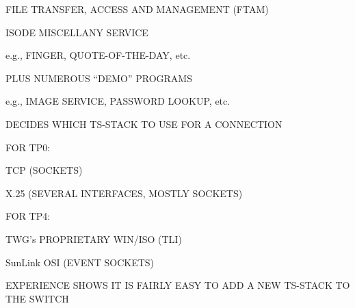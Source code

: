 

\begin{bwslide}

\begin{nrtc}
\item	FILE TRANSFER, ACCESS AND MANAGEMENT (FTAM)

\item	ISODE MISCELLANY SERVICE
    \begin{nrtc}
    \item	e.g., FINGER, QUOTE-OF-THE-DAY, etc.
    \end{nrtc}

\item	PLUS NUMEROUS ``DEMO'' PROGRAMS
    \begin{nrtc}
    \item	e.g., IMAGE SERVICE, PASSWORD LOOKUP, etc.
    \end{nrtc}
\end{nrtc}
\end{bwslide}


\begin{bwslide}

\begin{nrtc}
\item	DECIDES WHICH TS-STACK TO USE FOR A CONNECTION

\item	FOR TP0:
    \begin{nrtc}
    \item	TCP (SOCKETS)

    \item	X.25 (SEVERAL INTERFACES, MOSTLY SOCKETS)
    \end{nrtc}

\item	FOR TP4:
    \begin{nrtc}
    \item	TWG's PROPRIETARY WIN/ISO (TLI)

    \item	SunLink OSI (EVENT SOCKETS)
    \end{nrtc}

\item	EXPERIENCE SHOWS IT IS FAIRLY EASY TO ADD A NEW TS-STACK TO THE SWITCH
\end{nrtc}
\end{bwslide}


